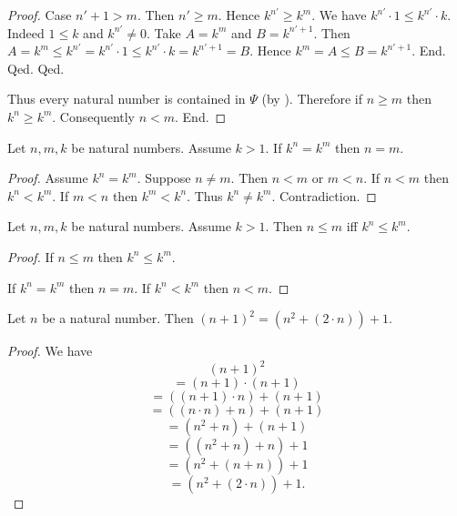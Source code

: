 \documentclass[10pt]{article}
\begin{document}
\begin{forthel}
\begin{proof}
            Case $n' + 1 > m$.
              Then $n' \geq m$.
              Hence $k^{n'} \geq k^{m}$.
              We have $k^{n'} \cdot 1 \leq k^{n'} \cdot k$.
              Indeed $1 \leq k$ and $k^{n'} \neq 0$.
              Take $A = k^{m}$ and $B = k^{n' + 1}$. %
              Then $A
                = k^{m}
                \leq k^{n'}
                = k^{n'} \cdot 1
                \leq k^{n'} \cdot k
                = k^{n' + 1}
                = B$.
              Hence $k^{m} = A \leq B = k^{n' + 1}$.
            End.
          Qed.
        Qed.

        Thus every natural number is contained in $\Psi$ (by ).
        Therefore if $n \geq m$ then $k^{n} \geq k^{m}$.
        Consequently $n < m$.
      End.
    \end{proof}
  \end{forthel}

  \begin{forthel}
    \begin{corollary}[id=ARITHMETIC_09_6780506905509888,printid]
      Let $n, m, k$ be natural numbers.
      Assume $k > 1$.
      If $k^{n} = k^{m}$ then $n = m$.
    \end{corollary}
    \begin{proof}
      Assume $k^{n} = k^{m}$.
      Suppose $n \neq m$.
      Then $n < m$ or $m < n$.
      If $n < m$ then $k^{n} < k^{m}$.
      If $m < n$ then $k^{m} < k^{n}$.
      Thus $k^{n} \neq k^{m}$.
      Contradiction.
    \end{proof}
  \end{forthel}

  \begin{forthel}
    \begin{corollary}[id=ARITHMETIC_09_2876620253691904,printid]
      Let $n, m, k$ be natural numbers.
      Assume $k > 1$.
      Then $n \leq m$ iff $k^{n} \leq k^{m}$.
    \end{corollary}
    \begin{proof}
      If $n \leq m$ then $k^{n} \leq k^{m}$.

      If $k^{n} = k^{m}$ then $n = m$.
      If $k^{n} < k^{m}$ then $n < m$.
    \end{proof}
  \end{forthel}

  \begin{forthel}
    \begin{proposition}[id=ARITHMETIC_09_6984104377581568,printid]
      Let $n$ be a natural number.
      Then $(n + 1)^{2} = (n^{2} + (2 \cdot n)) + 1$.
    \end{proposition}
    \begin{proof}
      We have
      \[  (n + 1)^{2}                       \]
      \[    = (n + 1) \cdot (n + 1)         \]
      \[    = ((n + 1) \cdot n) + (n + 1)   \]
      \[    = ((n \cdot n) + n) + (n + 1)   \]
      \[    = (n^{2} + n) + (n + 1)         \]
      \[    = ((n^{2} + n) + n) + 1         \]
      \[    = (n^{2} + (n + n)) + 1         \]
      \[    = (n^{2} + (2 \cdot n)) + 1.    \]
    \end{proof}
  \end{forthel}
\end{document}
